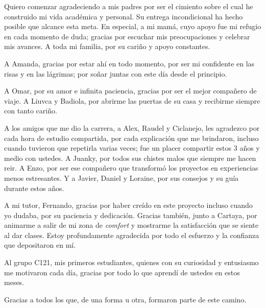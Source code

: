 \begin{acknowledgements}
    Quiero comenzar agradeciendo a mis padres por ser el cimiento sobre el cual he construido mi vida académica y personal. Su entrega incondicional ha hecho posible que alcance esta meta. En especial, a mi mamá, cuyo apoyo fue mi refugio en cada momento de duda; gracias por escuchar mis preocupaciones y celebrar mis avances. A toda mi familia, por su cariño y apoyo constantes.

    A Amanda, gracias por estar ahí en todo momento, por ser mi confidente en las risas y en las lágrimas; por soñar juntas con este día desde el principio.

    A Omar, por su amor e infinita paciencia, gracias por ser el mejor compañero de viaje. A Liuvca y Badiola, por abrirme las puertas de su casa y recibirme siempre con tanto cariño.

    A los amigos que me dio la carrera, a Alex, Raudel y Ciclanejo, les agradezco por cada hora de estudio compartida, por cada explicación que me brindaron, incluso cuando tuvieron que repetirla varias veces; fue un placer compartir estos 3 años y medio con ustedes. A Juanky, por todos sus chistes malos que siempre me hacen reir. A Enzo, por ser ese compañero que transformó los proyectos en experiencias menos estresantes. Y a Javier, Daniel y Loraine, por sus consejos y su guía durante estos años.

    A mi tutor, Fernando, gracias por haber creído en este proyecto incluso cuando yo dudaba, por su paciencia y dedicación. Gracias también, junto a Cartaya, por animarme a salir de mi zona de \textit{comfort} y mostrarme la satisfacción que se siente al dar clases. Estoy profundamente agradecida por todo el esfuerzo y la confianza que depositaron en mí.

    Al grupo C121, mis primeros estudiantes, quienes con su curiosidad y entusiasmo me motivaron cada día, gracias por todo lo que aprendí de ustedes en estos meses.

    Gracias a todos los que, de una forma u otra, formaron parte de este camino.
\end{acknowledgements}